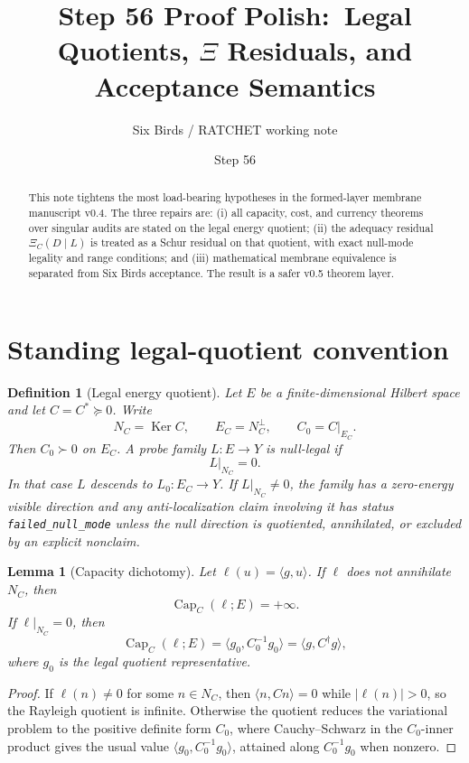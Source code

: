 \documentclass[11pt]{article}
\title{Step 56 Proof Polish:\ Legal Quotients, \texorpdfstring{$\Xi$}{Xi} Residuals, and Acceptance Semantics}
\author{Six Birds / RATCHET working note}
\date{Step 56}
\newtheorem{lemma}[theorem]{Lemma}
\newtheorem{definition}[theorem]{Definition}
\DeclareMathOperator{\Ker}{Ker}
\DeclareMathOperator{\Capacity}{Cap}
\begin{document}
\maketitle

\begin{abstract}
This note tightens the most load-bearing hypotheses in the formed-layer membrane manuscript v0.4.  The three repairs are: (i) all capacity, cost, and currency theorems over singular audits are stated on the legal energy quotient; (ii) the adequacy residual \(\Xi_C(D\mid L)\) is treated as a Schur residual on that quotient, with exact null-mode legality and range conditions; and (iii) mathematical membrane equivalence is separated from Six Birds acceptance.  The result is a safer v0.5 theorem layer.
\end{abstract}

\section{Standing legal-quotient convention}

\begin{definition}[Legal energy quotient]
Let \(E\) be a finite-dimensional Hilbert space and let \(C=C^*\succeq0\).  Write
\[
  N_C=\Ker C,
  \qquad
  E_C=N_C^\perp,
  \qquad
  C_0=C|_{E_C}.
\]
Then \(C_0\succ0\) on \(E_C\).  A probe family \(L:E\to Y\) is \emph{null-legal} if
\[
  L|_{N_C}=0.
\]
In that case \(L\) descends to \(L_0:E_C\to Y\).  If \(L|_{N_C}\ne0\), the family has a zero-energy visible direction and any anti-localization claim involving it has status \texttt{failed\_null\_mode} unless the null direction is quotiented, annihilated, or excluded by an explicit nonclaim.
\end{definition}

\begin{lemma}[Capacity dichotomy]
Let \(\ell(u)=\langle g,u\rangle\).  If \(\ell\) does not annihilate \(N_C\), then
\[
  \Capacity_C(\ell;E)=+\infty.
\]
If \(\ell|_{N_C}=0\), then
\[
  \Capacity_C(\ell;E)=\langle g_0,C_0^{-1}g_0\rangle
  =\langle g,C^\dagger g\rangle,
\]
where \(g_0\) is the legal quotient representative.
\end{lemma}

\begin{proof}
If \(\ell(n)\ne0\) for some \(n\in N_C\), then \(\langle n,Cn\rangle=0\) while \(|\ell(n)|>0\), so the Rayleigh quotient is infinite.  Otherwise the quotient reduces the variational problem to the positive definite form \(C_0\), where Cauchy--Schwarz in the \(C_0\)-inner product gives the usual value \(\langle g_0,C_0^{-1}g_0\rangle\), attained along \(C_0^{-1}g_0\) when nonzero.
\end{proof}
\end{document}
